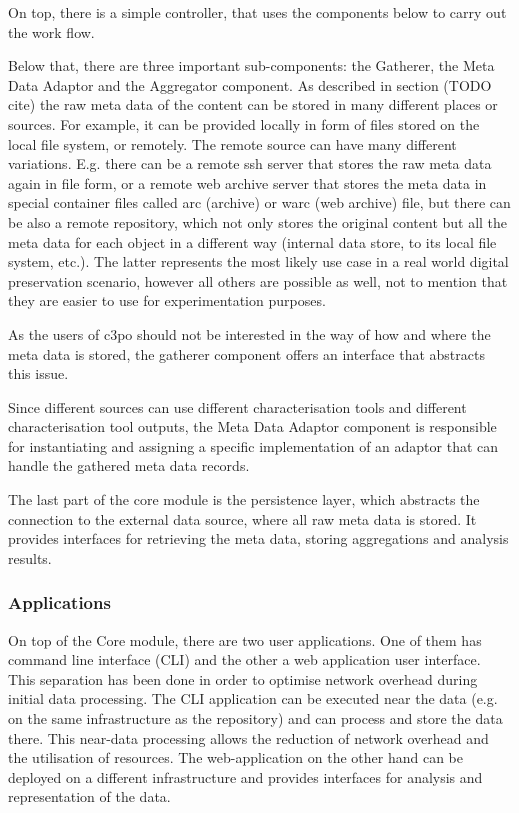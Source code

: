 On top, there is a simple controller, that uses the components below to carry out the work flow. 

Below that, there are three important sub-components: the Gatherer, the Meta Data Adaptor and the Aggregator component.
As described in section (TODO cite) the raw meta data of the content can be stored in many different places or sources. For example, it can be provided locally in form of files stored on the local file system, or remotely. The remote source can have many different variations. E.g. there can be a remote ssh server that stores the raw meta data again in file form, or a remote web archive server that stores the meta data in special container files called arc (archive) or warc (web archive) file, but there can be also a remote repository, which not only stores the original content but all the meta data for each object in a different way (internal data store, to its local file system, etc.). The latter represents the most likely use case in a real world digital preservation scenario, however all others are possible as well, not to mention that they are easier to use for experimentation purposes.

As the users of c3po should not be interested in the way of how and where the meta data is stored, the gatherer component offers an interface that abstracts this issue.

Since different sources can use different characterisation tools and different characterisation tool outputs, the Meta Data Adaptor component is responsible for instantiating and assigning a specific implementation of an adaptor that can handle the gathered meta data records. 

The last part of the core module is the persistence layer, which abstracts the connection to the external data source, where all raw meta data is stored. It provides interfaces for retrieving the meta data, storing aggregations and analysis results.

\subsubsection{Applications}
On top of the Core module, there are two user applications. One of them has command line interface (CLI) and the other a  web application user interface. This separation has been done in order to optimise network overhead during initial data processing. The CLI application can be executed near the data (e.g. on the same infrastructure as the repository) and can process and store the data there. This near-data processing allows the reduction of network overhead and the utilisation of resources. The web-application on the other hand can be deployed on a different infrastructure and provides interfaces for analysis and representation of the data.


